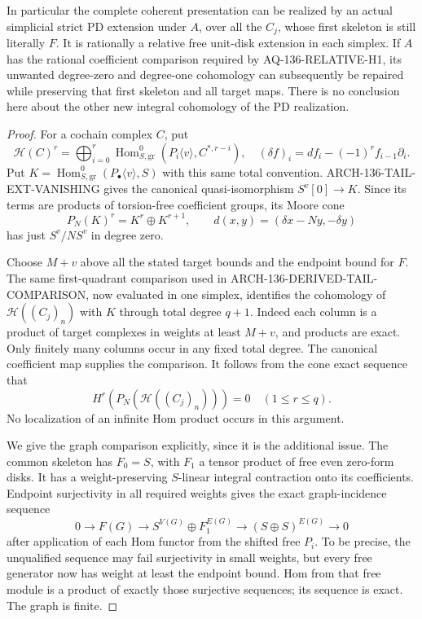 In particular the complete coherent presentation can be realized
by an actual simplicial strict PD extension under \(A\), over
all the \(C_j\), whose first skeleton is still literally
\(F\). It is rationally a relative free unit-disk extension
in each simplex. If \(A\) has the rational coefficient
comparison required by AQ-136-RELATIVE-H1, its unwanted
degree-zero and degree-one cohomology can subsequently be
repaired while preserving that first skeleton and all target
maps. There is no conclusion here about the other new integral
cohomology of the PD realization.

\begin{proof}
For a cochain complex \(C\), put
\[
 \mathcal H(C)^r=\bigoplus_{i=0}^r
        \operatorname{Hom}^0_{S,\mathrm{gr}}
                (P_i\langle v\rangle,C^{*,r-i}),
 \quad
 (\delta f)_i=df_i-(-1)^r f_{i-1}\partial_i.              \tag{136.CG4}
\]
Put \(K=\operatorname{Hom}^0_{S,\mathrm{gr}}
(P_\bullet\langle v\rangle,S)\) with this same total
convention. ARCH-136-TAIL-EXT-VANISHING gives the canonical
quasi-isomorphism \(S^v[0]\to K\). Since its terms are
products of torsion-free coefficient groups, its Moore cone
\[
 P_N(K)^r=K^r\oplus K^{r+1},\qquad
 d(x,y)=(\delta x-Ny,-\delta y)
\]
has just \(S^v/NS^v\) in degree zero.

Choose \(M+v\) above all the stated target bounds and the
endpoint bound for \(F\). The same first-quadrant comparison
used in ARCH-136-DERIVED-TAIL-COMPARISON, now evaluated in one
simplex, identifies the cohomology of
\(\mathcal H((C_j)_n)\) with \(K\) through total degree
\(q+1\). Indeed each column is a product of target complexes
in weights at least \(M+v\), and products are exact. Only
finitely many columns occur in any fixed total degree. The
canonical coefficient map supplies the comparison. It follows
from the cone exact sequence that
\[
 H^r(P_N(\mathcal H((C_j)_n)))=0
                         \quad(1\leq r\leq q).          \tag{136.CG5}
\]
No localization of an infinite Hom product occurs in this
argument.

We give the graph comparison explicitly, since it is the
additional issue. The common skeleton has \(F_0=S\), with
\(F_1\) a tensor product of free even zero-form disks.
It has a weight-preserving \(S\)-linear integral contraction
onto its coefficients. Endpoint surjectivity in all required
weights gives the exact graph-incidence sequence
\[
 0\longrightarrow F(G)\longrightarrow
       S^{V(G)}\oplus F_1^{E(G)}
       \longrightarrow (S\oplus S)^{E(G)}\longrightarrow0
                                                               \tag{136.CG6}
\]
after application of each Hom functor from the shifted free
\(P_i\). To be precise, the unqualified sequence may fail
surjectivity in small weights, but every free generator now
has weight at least the endpoint bound. Hom from that free
module is a product of exactly those surjective sequences;
its sequence is exact. The graph is finite.


\end{proof}
